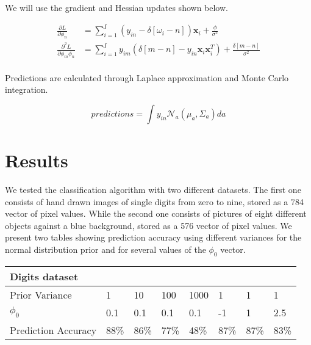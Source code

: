 \documentclass[12pt]{article}
\begin{document}
We will use the gradient and Hessian updates shown below.

\begin{align}
\label{Grad-Hess-Update}
\frac{\partial L}{ \partial \phi_{n}} &= \sum_{i = 1}^{I} \left( y_{in} - \delta \left[ \omega_{i} - n \right] \right) \mathbf{x}_{i}  + \frac{\phi} {\sigma^{2}} \nonumber \\
\frac{\partial^{2} L}{ \partial \phi_{m}\phi_{n}} &= \sum_{i = 1}^{I} y_{im} \left( \delta \left[ m - n \right] - y_{in} \mathbf{x}_{i} \mathbf{x}_{i}^{T}  \right) +  \frac{\delta \left[ m - n \right]}{\sigma^{2}} \nonumber \\
\end{align}

Predictions are calculated through Laplace approximation and Monte Carlo integration.

\begin{equation}
\label{Predictions}
predictions = \int y_{in} \mathcal{N}_{a} \left( \mu_{a}, \Sigma_{a} \right) da
\end{equation}
 
\section{Results}

We tested the classification algorithm with two different datasets.
The first one consists of hand drawn images of single digits from zero to nine, stored as a 784 vector of pixel values.
While the second one consists of pictures of eight different objects against a blue background, stored as a 576 vector of pixel values.
We present two tables showing prediction accuracy using different variances for the normal distribution prior and for several values of the $\phi_{0}$ vector. 

\begin{table}[h]
\begin{tabular}{l|lllllll}
Digits dataset &  &  &  &  &  &  &  \\ \hline
Prior Variance & \multicolumn{1}{l|}{1} & \multicolumn{1}{l|}{10} & \multicolumn{1}{l|}{100} & \multicolumn{1}{l|}{1000} & \multicolumn{1}{l|}{1} & \multicolumn{1}{l|}{1} & \multicolumn{1}{l|}{1} \\ \hline
$\phi_{0}$ & \multicolumn{1}{l|}{0.1} & \multicolumn{1}{l|}{0.1} & \multicolumn{1}{l|}{0.1} & \multicolumn{1}{l|}{0.1} & \multicolumn{1}{l|}{-1} & \multicolumn{1}{l|}{1} & \multicolumn{1}{l|}{2.5} \\ \hline
Prediction Accuracy & \multicolumn{1}{l|}{88\%} & \multicolumn{1}{l|}{86\%} & \multicolumn{1}{l|}{77\%} & \multicolumn{1}{l|}{48\%} & \multicolumn{1}{l|}{87\%} & \multicolumn{1}{l|}{87\%} & \multicolumn{1}{l|}{83\%} \\ \hline
\end{tabular}
\end{table}
\end{document}
